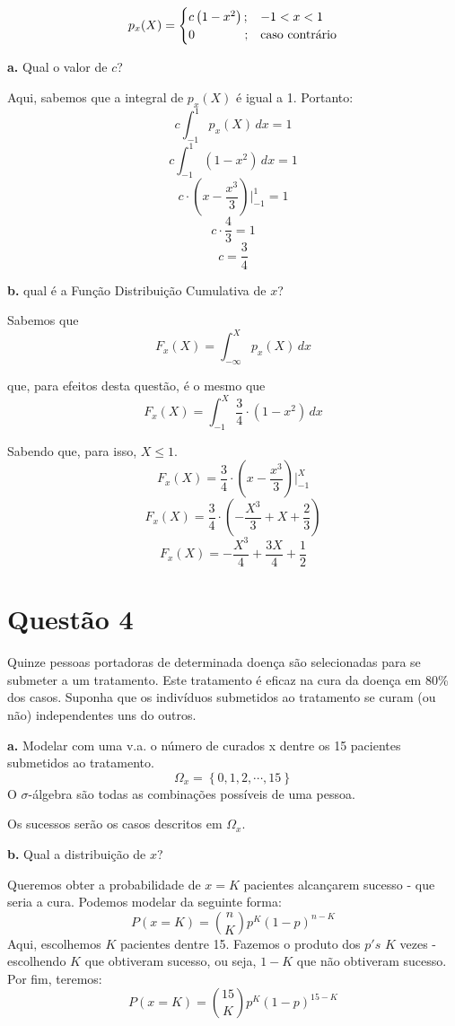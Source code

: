 \documentclass[a5paper]{report}
\begin{document}
\begin{equation*}
	p_x(X) =
	\begin{cases}
		c\left(1 - x^2 \right) ; & -1 < x < 1 \\
		0 \hspace{1.4cm}; & \text{caso contrário}
	\end{cases}       
\end{equation*}

\textbf{a.} Qual o valor de $c$?

Aqui, sabemos que a integral de $p_x(X)$ é igual a 1. Portanto:
\[c\int_{-1}^{1} p_x(X)\,dx = 1\]
\[c\int_{-1}^{1} (1 - x^2)\,dx = 1\]
\[c \cdot \left(x - \frac{x^3}{3}\right) \bigg|_{-1}^{1} = 1\]
\[c \cdot \frac{4}{3} = 1\]
\[c = \frac{3}{4}\]

\textbf{b.} qual é a Função Distribuição Cumulativa de $x$?

Sabemos que
\[F_x(X) = \int_{-\infty}^{X} p_x(X)\,dx\]

que, para efeitos desta questão, é o mesmo que
\[F_x(X) = \int_{-1}^{X} \frac{3}{4} \cdot \left(1 - x^2\right)\,dx\]

Sabendo que, para isso, $X \leq 1$.
\[F_x(X) = \frac{3}{4} \cdot \left(x - \frac{x^3}{3}\right) \bigg|_{-1}^{X}\]
\[F_x(X) = \frac{3}{4} \cdot \left(-\frac{X^3}{3} + X + \frac{2}{3}\right)\]
\[F_x(X) = -\frac{X^3}{4} + \frac{3X}{4} + \frac{1}{2}\]


\section*{Questão 4}
Quinze pessoas portadoras de determinada doença são selecionadas para se submeter
a um tratamento. Este tratamento é eficaz na cura da doença em 80\% dos casos.
Suponha que os indivíduos submetidos ao tratamento se curam (ou não) independentes
uns do outros.

\textbf{a.} Modelar com uma v.a. o número de curados x dentre os 15 pacientes submetidos ao tratamento.
\[\Omega_x = \left\{0, 1, 2, \cdots, 15\right\}\]
O $\sigma$-álgebra são todas as combinações possíveis de uma pessoa.

Os sucessos serão os casos descritos em $\Omega_x$.

\textbf{b.}
Qual a distribuição de $x$?

Queremos obter a probabilidade de $x = K$ pacientes alcançarem sucesso - que seria a cura. Podemos modelar da seguinte forma:
\[P(x = K) = \binom{n}{K} p^K (1 - p)^{n - K}\]
Aqui, escolhemos $K$ pacientes dentre 15. Fazemos o produto dos $p's$ $K$ vezes - escolhendo $K$ que obtiveram sucesso, ou seja, $1 - K$ que não obtiveram sucesso. Por fim, teremos:
\[P(x = K) = \binom{15}{K} p^K (1 - p)^{15 - K}\]
\end{document}
